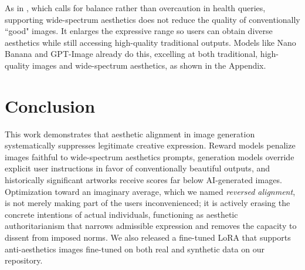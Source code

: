 
As in \citet{guo_position_2025}, which calls for balance rather than overcaution in health queries, supporting wide-spectrum aesthetics does not reduce the quality of conventionally “good" images. It enlarges the expressive range so users can obtain diverse aesthetics while still accessing high-quality traditional outputs. Models like Nano Banana and GPT-Image already do this, excelling at both traditional, high-quality images and wide-spectrum aesthetics, as shown in the Appendix.


\section{Conclusion} 
This work demonstrates that aesthetic alignment in image generation systematically suppresses legitimate creative expression. Reward models penalize images faithful to wide-spectrum aesthetics prompts, generation models override explicit user instructions in favor of conventionally beautiful outputs, and historically significant artworks receive scores far below AI-generated images. Optimization toward an imaginary average, which we named \emph{reversed alignment}, is not merely making part of the users inconvenienced; it is actively erasing the concrete intentions of actual individuals, functioning as aesthetic authoritarianism that narrows admissible expression and removes the capacity to dissent from imposed norms. We also released a fine-tuned LoRA \cite{hu_lora_2021} that supports anti-aesthetics images fine-tuned on both real and synthetic data on our repository.

